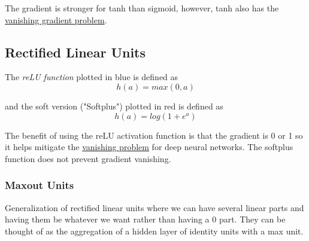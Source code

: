 \documentclass[12pt]{article}
\begin{document}
        The gradient is stronger for tanh than sigmoid, however, tanh also has the
        \hyperref[sec:VanishingProblem]{vanishing gradient problem}.

    \subsection{Rectified Linear Units} \label{sec:reLU}
        The \textit{reLU function} plotted in blue is defined as
        $$ h(a) = max(0, a) $$

        and the soft version ("Softplus") plotted in red is defined as
        $$ h(a) = log(1 + e^a) $$

        
        The benefit of using the reLU activation function is that the gradient is 0 or 1 so it helps mitigate the
        \hyperref[sec:VanishingProblem]{vanishing problem} for deep neural networks. The softplus function does not
        prevent gradient vanishing.
        
        \subsubsection{Maxout Units} \label{sec:MaxoutUnits}
            Generalization of rectified linear units where we can have several linear parts and having
            them be whatever we want rather than having a $0$ part. They can be thought of as the aggregation of a hidden
            layer of identity units with a max unit.
\end{document}
